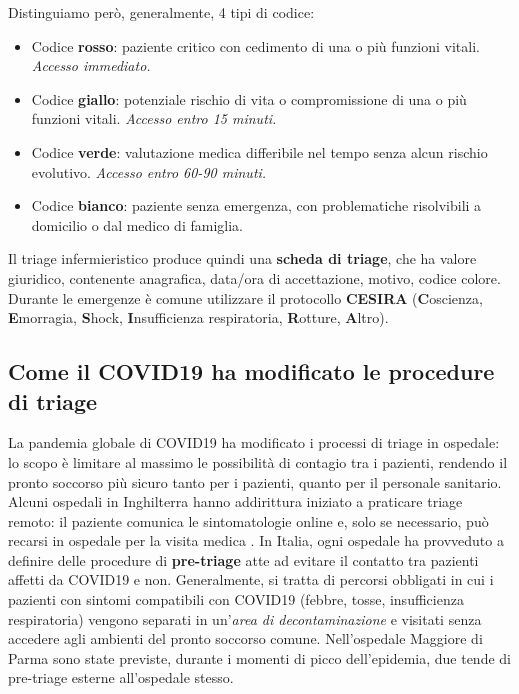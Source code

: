 Distinguiamo però, generalmente, 4 tipi di codice:
\begin{itemize}
    \item Codice \textbf{rosso}: paziente critico con cedimento di una o più funzioni vitali. \textit{Accesso immediato.}
    \item Codice \textbf{giallo}: potenziale rischio di vita o compromissione di una o più funzioni vitali. \textit{Accesso entro 15 minuti.}
    \item Codice \textbf{verde}: valutazione medica differibile nel tempo senza alcun rischio evolutivo. \textit{Accesso entro 60-90 minuti.}
    \item Codice \textbf{bianco}: paziente senza emergenza, con problematiche risolvibili a domicilio o dal medico di famiglia.
\end{itemize}
Il triage infermieristico produce quindi una \textbf{scheda di triage}, che ha valore giuridico, contenente anagrafica, data/ora di accettazione, motivo, codice colore.
Durante le emergenze è comune utilizzare il protocollo \textbf{CESIRA} (\textbf{C}oscienza, \textbf{E}morragia, \textbf{S}hock, \textbf{I}nsufficienza respiratoria, \textbf{R}otture, \textbf{A}ltro).
\subsection{Come il COVID19 ha modificato le procedure di triage}
La pandemia globale di COVID19 ha modificato i processi di triage in ospedale: lo scopo è limitare al massimo le possibilità di contagio tra i pazienti, rendendo il pronto soccorso più sicuro tanto per i pazienti, quanto per il personale sanitario. Alcuni ospedali in Inghilterra hanno addirittura iniziato a praticare triage remoto: il paziente comunica le sintomatologie online e, solo se necessario, può recarsi in ospedale per la visita medica \cite{article:digital_triage}. In Italia, ogni ospedale ha provveduto a definire delle procedure di \textbf{pre-triage} atte ad evitare il contatto tra pazienti affetti da COVID19 e non. Generalmente, si tratta di percorsi obbligati in cui i pazienti con sintomi compatibili con COVID19 (febbre, tosse, insufficienza respiratoria) vengono separati in un'\textit{area di decontaminazione} e visitati senza accedere agli ambienti del pronto soccorso comune. Nell'ospedale Maggiore di Parma sono state previste, durante i momenti di picco dell'epidemia, due tende di pre-triage esterne all'ospedale stesso.